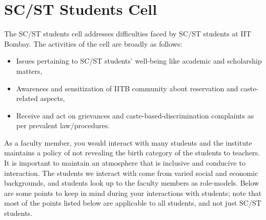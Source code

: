 \documentclass[
  10pt,
  a5paper,
  10pt,
  openany]{amsbook}
\providecommand{\tightlist}{%
  \setlength{\itemsep}{0pt}\setlength{\parskip}{0pt}}
\begin{document}
\section{SC/ST Students Cell}\label{scst-students-cell}

The SC/ST students cell addresses difficulties faced by SC/ST students
at IIT Bombay. The activities of the cell are broadly as follows:

\begin{itemize}
\tightlist
\item
  Issues pertaining to SC/ST students' well-being like academic and
  scholarship matters,
\item
  Awareness and sensitization of IITB community about reservation and
  caste-related aspects,
\item
  Receive and act on grievances and caste-based-discrimination
  complaints as per prevalent law/procedures.
\end{itemize}

As a faculty member, you would interact with many students and the
institute maintains a policy of not revealing the birth category of the
students to teachers. It is important to maintain an atmosphere that is
inclusive and conducive to interaction. The students we interact with
come from varied social and economic backgrounds, and students look up
to the faculty members as role-models. Below are some points to keep in
mind during your interactions with students; note that most of the
points listed below are applicable to all students, and not just SC/ST
students.
\end{document}
